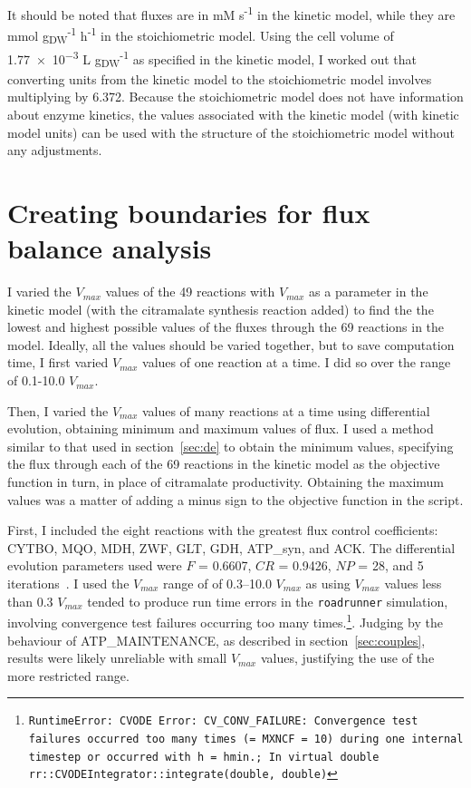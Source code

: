\documentclass[parskip=full]{scrreprt}
\begin{document}
It should be noted that fluxes are in mM s\textsuperscript{-1} in the kinetic model, while they are mmol g\textsubscript{DW}\textsuperscript{-1} h\textsuperscript{-1} in the stoichiometric model. Using the cell volume of \num{1.77e-3} L g\textsubscript{DW}\textsuperscript{-1} as specified in the kinetic model, I worked out that converting units from the kinetic model to the stoichiometric model involves multiplying by 6.372. Because the stoichiometric model does not have information about enzyme kinetics, the values associated with the kinetic model (with kinetic model units) can be used with the structure of the stoichiometric model without any adjustments.

\section{Creating boundaries for flux balance analysis}
\label{sec:bounds}

I varied the $V_{max}$ values of the 49 reactions with $V_{max}$ as a parameter in the kinetic model (with the citramalate synthesis reaction added) to find the the lowest and highest possible values of the fluxes through the 69 reactions in the model. Ideally, all the values should be varied together, but to save computation time, I first varied $V_{max}$ values of one reaction at a time. I did so over the range of 0.1-10.0 $V_{max}$.

Then, I varied the $V_{max}$ values of many reactions at a time using differential evolution, obtaining minimum and maximum values of flux. I used a method similar to that used in section~\ref{sec:de} to obtain the minimum values, specifying the flux through each of the 69 reactions in the kinetic model as the objective function in turn, in place of citramalate productivity. Obtaining the maximum values was a matter of adding a minus sign to the objective function in the script.

First, I included the eight reactions with the greatest flux control coefficients: CYTBO, MQO, MDH, ZWF, GLT, GDH, ATP\_syn, and ACK. The differential evolution parameters used were $F$ = 0.6607, $CR$ = 0.9426, $NP$ = 28, and 5 iterations~\cite{pedersen_good_2010}. I used the $V_{max}$ range of of 0.3--10.0 $V_{max}$ as using $V_{max}$ values less than 0.3 $V_{max}$ tended to produce run time errors in the \texttt{roadrunner} simulation, involving convergence test failures occurring too many times.\footnote{\texttt{RuntimeError: CVODE Error: CV\_CONV\_FAILURE: Convergence test failures occurred too many times (= MXNCF = 10) during one internal timestep or occurred with \textbar{}h\textbar{} = hmin.; In virtual double rr::CVODEIntegrator::integrate(double, double)}}. Judging by the behaviour of ATP\_MAINTENANCE, as described in section~\ref{sec:couples}, results were likely unreliable with small $V_{max}$ values, justifying the use of the more restricted range.
\end{document}
